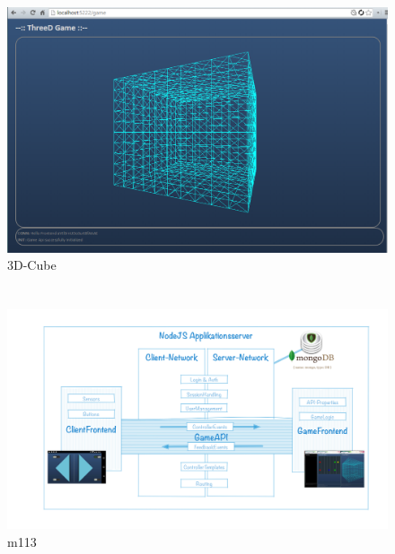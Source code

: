 \documentclass[a4paper]{spie}  %
\begin{document}
\begin{appendices}
\section{}

\begin{figure}[H]
	\centering
	\includegraphics[width=1\textwidth]{images/FrontendInit}
	\caption{3D-Cube}
	\label{3dcube}
\end{figure}

\section{}
\begin{figure}[H]
	\centering
	\includegraphics[width=1\textwidth]{images/arch/M113.png}
	\caption{m113}
	\label{m113}
\end{figure}


\end{appendices}
\end{document}
